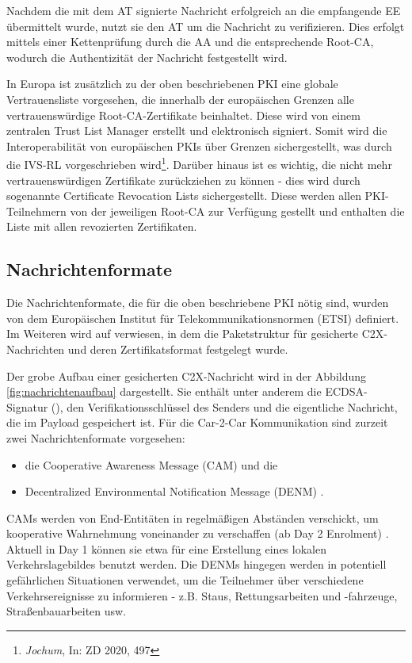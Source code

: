 Nachdem die mit dem AT signierte Nachricht erfolgreich an die empfangende EE übermittelt wurde, nutzt sie den AT um die Nachricht zu verifizieren. Dies erfolgt mittels einer Kettenprüfung durch die AA und die entsprechende Root-CA, wodurch die Authentizität der Nachricht festgestellt wird.

In Europa ist zusätzlich zu der oben beschriebenen PKI eine globale Vertrauensliste vorgesehen, die innerhalb der europäischen Grenzen alle vertrauenswürdige Root-CA-Zertifikate beinhaltet. Diese wird von einem zentralen Trust List Manager erstellt und elektronisch signiert. Somit wird die Interoperabilität von europäischen PKIs über Grenzen sichergestellt, was durch die IVS-RL vorgeschrieben wird\footnote{\emph{Jochum}, In: ZD 2020, 497}. Darüber hinaus ist es wichtig, die nicht mehr vertrauenswürdigen Zertifikate zurückziehen zu können - dies wird durch sogenannte Certificate Revocation Lists sichergestellt. Diese werden allen PKI-Teilnehmern von der jeweiligen Root-CA zur Verfügung gestellt und enthalten die Liste mit allen revozierten Zertifikaten.  

\subsection{Nachrichtenformate}
\label{sec:FirstContentSection:SecondSubSection}

Die Nachrichtenformate, die für die oben beschriebene PKI nötig sind, wurden von dem Europäischen Institut für Telekommunikationsnormen (ETSI) definiert. Im Weiteren wird auf \cite{ETSI2018} verwiesen, in dem die Paketstruktur für gesicherte C2X-Nachrichten und deren Zertifikatsformat festgelegt wurde. 

Der grobe Aufbau einer gesicherten C2X-Nachricht wird in der Abbildung \ref{fig:nachrichtenaufbau} dargestellt. Sie enthält unter anderem die ECDSA-Signatur (\cite{Barker2013}), den Verifikationsschlüssel des Senders und die eigentliche Nachricht, die im Payload gespeichert ist. Für die Car-2-Car Kommunikation sind zurzeit zwei Nachrichtenformate vorgesehen:
\begin{itemize}
	\item die Cooperative Awareness Message (CAM) und die 
	\item Decentralized Environmental Notification Message (DENM) \cite{ETSI2013}.
\end{itemize}
CAMs werden von End-Entitäten in regelmäßigen Abständen verschickt, um kooperative Wahrnehmung voneinander zu verschaffen (ab Day 2 Enrolment) . Aktuell in Day 1 können sie etwa für eine Erstellung eines lokalen Verkehrslagebildes benutzt werden. Die DENMs hingegen werden in potentiell gefährlichen Situationen verwendet, um die Teilnehmer über verschiedene Verkehrsereignisse zu informieren - z.B. Staus, Rettungsarbeiten und -fahrzeuge, Straßenbauarbeiten usw. 

